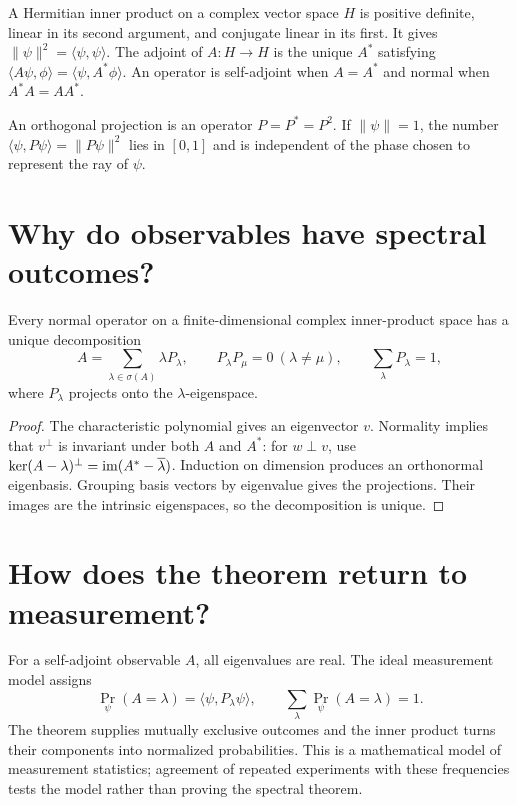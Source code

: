A Hermitian inner product on a complex vector space $H$ is positive definite,
linear in its second argument, and conjugate linear in its first.  It gives
$\|\psi\|^2=\langle\psi,\psi\rangle$.  The adjoint of $A:H\to H$ is the
unique $A^*$ satisfying
$\langle A\psi,\phi\rangle=\langle\psi,A^*\phi\rangle$.
An operator is self-adjoint when $A=A^*$ and normal when $A^*A=AA^*$.

An orthogonal projection is an operator $P=P^*=P^2$.  If $\|\psi\|=1$, the
number $\langle\psi,P\psi\rangle=\|P\psi\|^2$ lies in $[0,1]$ and is
independent of the phase chosen to represent the ray of $\psi$.

\section{Why do observables have spectral outcomes?}

\begin{theorem}
Every normal operator on a finite-dimensional complex inner-product space has
a unique decomposition
\[
A=\sum_{\lambda\in\sigma(A)}\lambda P_\lambda,
\qquad P_\lambda P_\mu=0\ (\lambda\ne\mu),
\qquad \sum_\lambda P_\lambda=1,
\]
where $P_\lambda$ projects onto the $\lambda$-eigenspace.
\end{theorem}

\begin{proof}
The characteristic polynomial gives an eigenvector $v$.  Normality implies
that $v^\perp$ is invariant under both $A$ and $A^*$: for $w\perp v$, use
$\ker(A-\lambda)^\perp=\operatorname{im}(A^*-\overline\lambda)$.  Induction on dimension
produces an orthonormal eigenbasis.  Grouping basis vectors by eigenvalue
gives the projections.  Their images are the intrinsic eigenspaces, so the
decomposition is unique.
\end{proof}

\section{How does the theorem return to measurement?}

For a self-adjoint observable $A$, all eigenvalues are real.  The ideal
measurement model assigns
\[
\Pr_\psi(A=\lambda)=\langle\psi,P_\lambda\psi\rangle,
\qquad
\sum_\lambda\Pr_\psi(A=\lambda)=1.
\]
The theorem supplies mutually exclusive outcomes and the inner product turns
their components into normalized probabilities.  This is a mathematical
model of measurement statistics; agreement of repeated experiments with
these frequencies tests the model rather than proving the spectral theorem.

